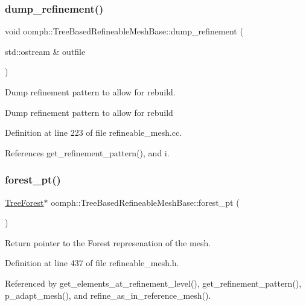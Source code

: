 \subsubsection{\texorpdfstring{dump\+\_\+refinement()}{dump\_refinement()}}
{\footnotesize\ttfamily void oomph\+::\+Tree\+Based\+Refineable\+Mesh\+Base\+::dump\+\_\+refinement (\begin{DoxyParamCaption}\item[{std\+::ostream \&}]{outfile }\end{DoxyParamCaption})\hspace{0.3cm}{\ttfamily [virtual]}}



Dump refinement pattern to allow for rebuild. 

Dump refinement pattern to allow for rebuild 

Definition at line 223 of file refineable\+\_\+mesh.\+cc.



References get\+\_\+refinement\+\_\+pattern(), and i.

\mbox{\label{classoomph_1_1TreeBasedRefineableMeshBase_a3c5084830a90bf527a27271613b858a7}} 
\subsubsection{\texorpdfstring{forest\+\_\+pt()}{forest\_pt()}}
{\footnotesize\ttfamily \hyperlink{classoomph_1_1TreeForest}{Tree\+Forest}$\ast$ oomph\+::\+Tree\+Based\+Refineable\+Mesh\+Base\+::forest\+\_\+pt (\begin{DoxyParamCaption}{ }\end{DoxyParamCaption})\hspace{0.3cm}{\ttfamily [inline]}}



Return pointer to the Forest represenation of the mesh. 



Definition at line 437 of file refineable\+\_\+mesh.\+h.



Referenced by get\+\_\+elements\+\_\+at\+\_\+refinement\+\_\+level(), get\+\_\+refinement\+\_\+pattern(), p\+\_\+adapt\+\_\+mesh(), and refine\+\_\+as\+\_\+in\+\_\+reference\+\_\+mesh().

